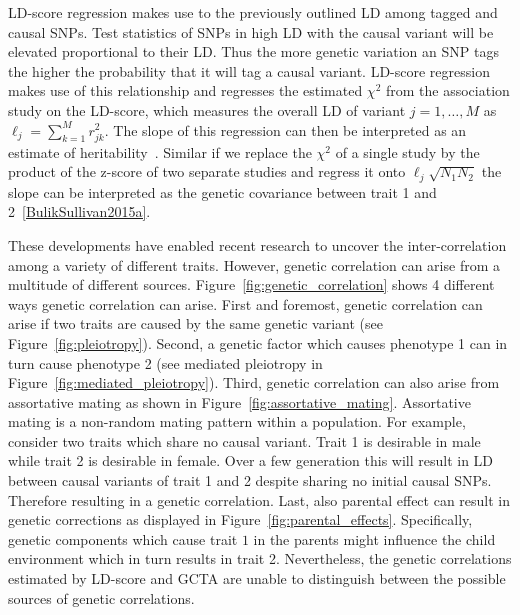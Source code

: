 LD-score regression makes use to the previously outlined LD among tagged and causal SNPs.
Test statistics of SNPs in high LD with the causal variant will be elevated proportional to their LD\@.
Thus the more genetic variation an SNP tags the higher the probability that it will tag a causal variant.
LD-score regression makes use of this relationship and regresses the estimated $\chi^2$ from the association study on the LD-score, which measures the overall LD of variant $j = 1, \ldots, M$ as $\ell_j = \sum^M_{k=1} r^2_{jk}$. 
The slope of this regression can then be interpreted as an estimate of heritability~\cite{Bulik-Sullivan2015}.
Similar if we replace the $\chi^2$ of a single study by the product of the z-score of two separate studies and regress it onto $\ell_j \sqrt{N_{1}N_{2}}$ the slope can be interpreted as the genetic covariance between trait 1 and 2~\ref{BulikSullivan2015a}.

These developments have enabled recent research to uncover the inter-correlation among a variety of different traits.
However, genetic correlation can arise from a multitude of different sources.
Figure~\ref{fig:genetic_correlation} shows 4 different ways genetic correlation can arise.
First and foremost, genetic correlation can arise if two traits are caused by the same genetic variant (see Figure~\ref{fig:pleiotropy}).
Second, a genetic factor which causes phenotype 1 can in turn cause phenotype 2 (see mediated pleiotropy in Figure~\ref{fig:mediated_pleiotropy}).
Third, genetic correlation can also arise from assortative mating as shown in Figure~\ref{fig:assortative_mating}.
Assortative mating is a non-random mating pattern within a population.
For example, consider two traits which share no causal variant.
Trait 1 is desirable in male while trait 2 is desirable in female.
Over a few generation this will result in LD between causal variants of trait 1 and 2 despite sharing no initial causal SNPs.
Therefore resulting in a genetic correlation. 
Last, also parental effect can result in genetic corrections as displayed in Figure~\ref{fig:parental_effects}.
Specifically, genetic components which cause trait $1$ in the parents might influence the child environment which in turn results in trait 2. 
Nevertheless, the genetic correlations estimated by LD-score and GCTA are unable to distinguish between the possible sources of genetic correlations.


